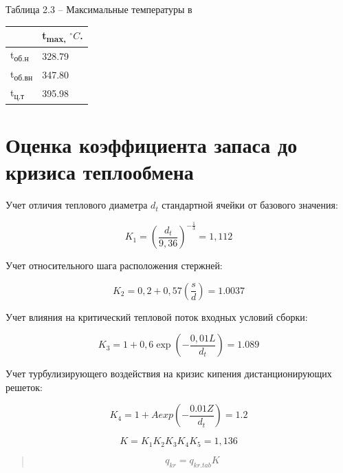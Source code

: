 Таблица 2.3 -- Максимальные температуры в 

\begin{longtable}[]{@{}|C{4cm}|C{4cm}|@{}} 
\toprule
& t\textsubscript{max,} $^\circ C$.\tabularnewline
\midrule
\endhead
t\textsubscript{об.н} & 328.79\\ \hline
t\textsubscript{об.вн} & 347.80\\ \hline
t\textsubscript{ц.т} & 395.98\\ 
\bottomrule
\end{longtable}

\clearpage

\section{Оценка коэффициента запаса до кризиса теплообмена}

Учет отличия теплового диаметра $d_{t}$ стандартной ячейки от базового
значения:

\begin{equation}
K_{1} = \left( \frac{d_{t}}{9,36} \right)^{- \frac{1}{3}} = 1,112
\end{equation}


Учет относительного шага расположения стержней:

\begin{equation}
K_{2} = 0,2 + 0,57\left( \frac{s}{d} \right) = 1.0037
\end{equation}


Учет влияния на критический тепловой поток входных условий сборки:

\begin{equation}
K_{3} = 1 + 0,6\exp{\left( - \frac{0,01L}{d_{t}} \right) = 1.089}
\end{equation}


Учет турбулизирующего воздействия на кризис кипения дистанционирующих
решеток:

\begin{equation}
K_{4} = 1 + Aexp\left( - \frac{0.01Z}{d_{t}} \right) = 1.2
\end{equation}

\begin{equation}
K = K_{1}K_{2}K_{3}K_{4}K_{5} = 1,136
\end{equation}

\begin{quote}
\[q_{kr} = q_{kr.tab}K\]
\end{quote}


